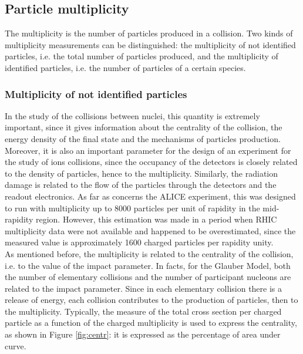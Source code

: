 \subsection{Particle multiplicity}
The multiplicity is the number of particles produced in a collision. Two kinds of multiplicity measurements can be distinguished: the multiplicity of not identified particles, i.e. the total number of particles produced, and the multiplicity of identified particles, i.e. the number of particles of a certain species.
\subsubsection{Multiplicity of not identified particles}
In the study of the collisions between nuclei, this quantity is extremely important, since it gives information about the centrality of the collision, the energy density of the final state and the mechanisms of particles production. Moreover, it is also an important parameter for the design of an experiment for the study of ions collisions, since the occupancy of the detectors is closely related to the density of particles, hence to the multiplicity. Similarly, the radiation damage is related to the flow of the particles through the detectors and the readout electronics. As far as concerns the ALICE experiment, this was designed to run with multiplicity up to 8000 particles per unit of rapidity in the mid-rapidity region. However, this estimation was made in a period when RHIC multiplicity data were not available and happened to be overestimated, since the measured value is approximately 1600 charged particles per rapidity unity\cite{mult}.\\  
As mentioned before, the multiplicity is related to the centrality of the collision, i.e. to the value of the impact parameter. In facts, for the Glauber Model, both the number of elementary collisions and the number of participant nucleons are related to the impact parameter. Since in each elementary collision there is a release of energy, each collision contributes to the production of particles, then to the multiplicity. Typically, the measure of the total cross section per charged particle as a function of the charged multiplicity is used to express the centrality, as shown in Figure \ref{fig:centr}: it is expressed as the percentage of area under curve.\\
%
